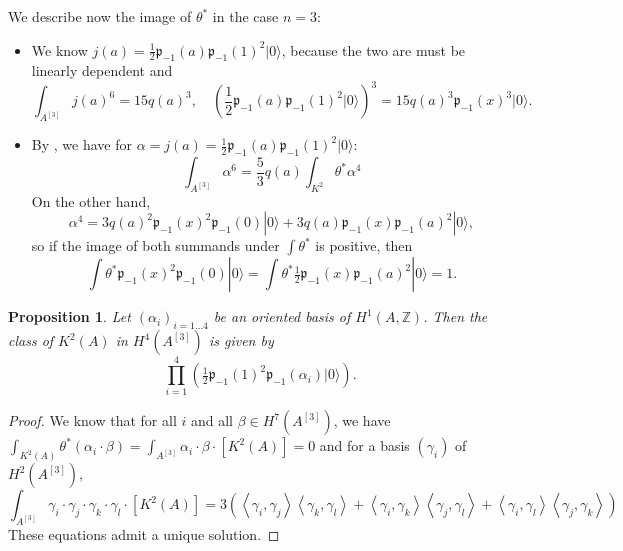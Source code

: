 \documentclass{amsart}
\newcommand{\hilb}[1]{^{[#1]}}
\newcommand{\vac}{|0\rangle}
\newcommand{\p}{\mathfrak{p}}
\newcommand{\pone}{ \mathfrak{p}_{ - 1} }
\newcommand{\Z}{\mathbb{Z}}
\theoremstyle{plain}
\newtheorem{proposition}[theorem]{Proposition}
\theoremstyle{definition}
\theoremstyle{remark}
\begin{document}
We describe now the image of $\theta^*$ in the case $n=3$:
\begin{itemize}
\item We know $j(a)=\frac{1}{2}\p_{-1}(a)\p_{-1}(1)^2\vac$, because the two are must be linearly dependent and
$$ \int_{A\hilb{3}}j(a)^6 = 15 q(a)^3, \quad \left(\frac{1}{2}\p_{-1}(a)\p_{-1}(1)^2\vac\right)^3 = 15 q(a)^3\p_{-1}(x)^3\vac.
$$
\item By \cite[p. 8]{Britze}, we have for $\alpha = j(a)=\frac{1}{2}\p_{-1}(a)\p_{-1}(1)^2\vac$: 
$$ \int_{A\hilb{3}}\alpha^6 = \frac{5}{3} q(a) \int_{K^2} \theta^* \alpha^4
$$
On the other hand, 
$$\alpha^4 = 3 q(a)^2\p_{-1}(x)^2\p_{-1}(0)\vac + 3q(a) \p_{-1}(x) \p_{-1}(a)^2\vac,$$
so if the image of both summands under $\int\theta^*$ is positive, then 
$$ \int\theta^*\p_{-1}(x)^2\p_{-1}(0)\vac = \int\theta^* \tfrac{1}{2}\p_{-1}(x) \p_{-1}(a)^2\vac=1 .$$ 

\end{itemize}
\begin{proposition}
Let $(\alpha_i)_{i=1\ldots 4}$ be an oriented basis of $H^1(A,\Z)$. Then the class of $K^2(A)$ in $H^4(A\hilb{3})$ is given by
$$
\prod_{i=1}^4 \left(\tfrac{1}{2}\pone(1)^2\pone(\alpha_i)\vac\right).
$$ 
\end{proposition}
\begin{proof}
We know that for all $i$ and all $\beta\in H^7(A\hilb{3})$, we have $\int_ {K^2(A)}\theta^*(\alpha_i\cdot\beta) = \int_ {A\hilb{3}}\alpha_i\cdot\beta \cdot[K^2(A)]= 0$ and
for a basis $(\gamma_i) $ of  $H^2(A\hilb{3})$,
$$
\int_ {A\hilb{3}}\gamma_i\cdot\gamma_j\cdot\gamma_k\cdot\gamma_l\cdot[K^2(A)] =
 3\left(\left<\gamma_i,\gamma_j\right>\left<\gamma_k,\gamma_l\right>+\left<\gamma_i,\gamma_k\right>\left<\gamma_j,\gamma_l\right>+\left<\gamma_i,\gamma_l\right>\left<\gamma_j,\gamma_k\right>  \right)
$$
These equations admit a unique solution.
\end{proof}
\end{document}
